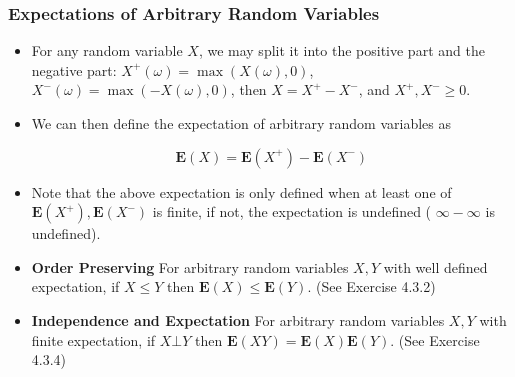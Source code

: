 \documentclass[handout]{beamer}
\newcommand{\BE}{\mathbf{E}}
\begin{document}
\frame
{
  \frametitle{Expectations of Arbitrary Random Variables}

\begin{itemize}


                         
\item<1-> For any random variable $X$, we may split it into the positive part and the negative part: $X^{+}(\omega) =\max(X(\omega), 0)$, $X^{-}(\omega) =\max(-X(\omega), 0)$, then $X=X^{+}-X^-$, and $X^+, X^-\geq 0$.
                         
\item<2-> We can then define the expectation of arbitrary random variables as 
                                                  
                                                  $$\BE(X)=\BE(X^+)-\BE(X^-)$$
                                                                           
\item<3->  Note that the above expectation is only defined when at least one of  $\BE(X^+), \BE(X^-)$ is finite, if not, the expectation is undefined ( $\infty-\infty$ is undefined).                         
                              
\item<4-> \textbf{Order Preserving} For arbitrary random variables $X, Y$ with well defined expectation, if $X\leq Y$ then $\BE(X)\leq \BE(Y)$. (See Exercise 4.3.2)

\item<5-> \textbf{Independence and Expectation} For arbitrary random variables $X, Y$ with finite expectation, if $X\bot Y$ then $\BE(XY)=\BE(X) \BE(Y)$. (See Exercise 4.3.4)

                                          
\end{itemize}
}
\end{document}
